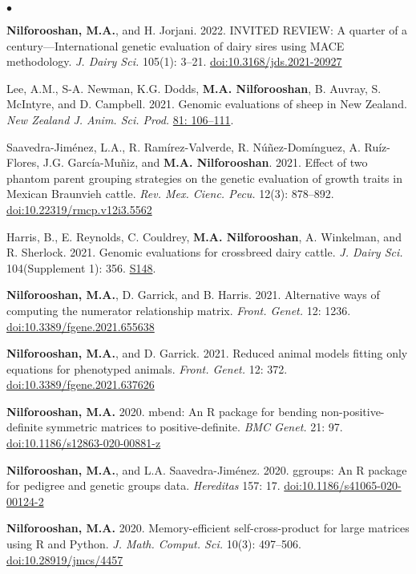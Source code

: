 \documentclass[margin,line]{res}
\newenvironment{list2}{
  \begin{list}{$\bullet$}{%
      \setlength{\itemsep}{0in}
      \setlength{\parsep}{0in} \setlength{\parskip}{0in}
      \setlength{\topsep}{0in} \setlength{\partopsep}{0in}
      \setlength{\leftmargin}{0.2in}}}{\end{list}}
\begin{document}
\begin{resume}
\begin{list2}
\item {\bf Nilforooshan, M.A.}, and H. Jorjani. 2022. INVITED REVIEW: A quarter of a century---International genetic evaluation of dairy sires using MACE methodology. {\em J. Dairy Sci.} 105(1): 3--21. \href{https://doi.org/10.3168/jds.2021-20927}{doi:10.3168/jds.2021-20927}
\item Lee, A.M., S-A. Newman, K.G. Dodds, {\bf M.A. Nilforooshan}, B. Auvray, S. McIntyre, and D. Campbell. 2021. Genomic evaluations of sheep in New Zealand. {\em New Zealand J. Anim. Sci. Prod.} \href{http://www.nzsap.org/proceedings/genomic-evaluations-sheep-new-zealand}{81: 106--111}.
\item Saavedra-Jim\'{e}nez, L.A., R. Ram\'{i}rez-Valverde, R. N\'{u}\~{n}ez-Dom\'{i}nguez, A. Ru\'{i}z-Flores, J.G. Garc\'{i}a-Mu\~{n}iz, and {\bf M.A. Nilforooshan}. 2021. Effect of two phantom parent grouping strategies on the genetic evaluation of growth traits in Mexican Braunvieh cattle. {\em Rev. Mex. Cienc. Pecu.} 12(3): 878--892. \href{https://doi.org/10.22319/rmcp.v12i3.5562}{doi:10.22319/rmcp.v12i3.5562}
\item Harris, B., E. Reynolds, C. Couldrey, {\bf M.A. Nilforooshan}, A. Winkelman, and R. Sherlock. 2021. Genomic evaluations for crossbreed dairy cattle. {\em J. Dairy Sci.} 104(Supplement 1): 356. \href{https://www.adsa.org/Portals/0/SiteContent/Docs/Meetings/2021ADSA/ADSA2021_Abstracts.pdf}{S148}.
\item {\bf Nilforooshan, M.A.}, D. Garrick, and B. Harris. 2021. Alternative ways of computing the numerator relationship matrix. {\em Front. Genet.} 12: 1236. \href{https://doi.org/10.3389/fgene.2021.655638}{doi:10.3389/fgene.2021.655638}
\item {\bf Nilforooshan, M.A.}, and D. Garrick. 2021. Reduced animal models fitting only equations for phenotyped animals. {\em Front. Genet.} 12: 372. \href{https://doi.org/10.3389/fgene.2021.637626}{doi:10.3389/fgene.2021.637626}
\item {\bf Nilforooshan, M.A.} 2020. mbend: An R package for bending non-positive-deﬁnite symmetric matrices to positive-deﬁnite. {\em BMC Genet.} 21: 97. \href{https://doi.org/10.1186/s12863-020-00881-z}{doi:10.1186/s12863-020-00881-z}
\item {\bf Nilforooshan, M.A.}, and L.A. Saavedra-Jim\'{e}nez. 2020. ggroups: An R package for pedigree and genetic groups data. {\em Hereditas} 157: 17. \href{https://doi.org/10.1186/s41065-020-00124-2}{doi:10.1186/s41065-020-00124-2}
\item {\bf Nilforooshan, M.A.} 2020. Memory-efficient self-cross-product for large matrices using R and Python. {\em J. Math. Comput. Sci.} 10(3): 497--506. \href{https://doi.org/10.28919/jmcs/4457}{doi:10.28919/jmcs/4457}

\end{list2}
\end{resume}
\end{document}
